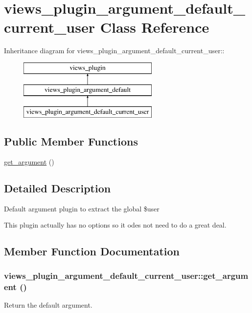 \hypertarget{classviews__plugin__argument__default__current__user}{
\section{views\_\-plugin\_\-argument\_\-default\_\-current\_\-user Class Reference}
\label{classviews__plugin__argument__default__current__user}
}
Inheritance diagram for views\_\-plugin\_\-argument\_\-default\_\-current\_\-user::\begin{figure}[H]
\begin{center}
\leavevmode
\includegraphics[height=3cm]{classviews__plugin__argument__default__current__user}
\end{center}
\end{figure}
\subsection*{Public Member Functions}
\begin{DoxyCompactItemize}
\item 
\hyperlink{classviews__plugin__argument__default__current__user_aa17e9b1b32a46e9030cf2edd0ed074b8}{get\_\-argument} ()
\end{DoxyCompactItemize}


\subsection{Detailed Description}
Default argument plugin to extract the global \$user

This plugin actually has no options so it odes not need to do a great deal. 

\subsection{Member Function Documentation}
\hypertarget{classviews__plugin__argument__default__current__user_aa17e9b1b32a46e9030cf2edd0ed074b8}{
\subsubsection[{get\_\-argument}]{\setlength{\rightskip}{0pt plus 5cm}views\_\-plugin\_\-argument\_\-default\_\-current\_\-user::get\_\-argument ()}}
\label{classviews__plugin__argument__default__current__user_aa17e9b1b32a46e9030cf2edd0ed074b8}
Return the default argument.

